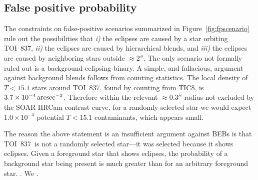 \documentclass[12pt,twocolumn,tighten]{aastex63}
\newcommand{\tn}{TOI~837} %
\begin{document}
\subsection{False positive probability}
\label{subsec:fpp}

The constraints on false-positive scenarios summarized in
Figure~\ref{fig:fpscenario} rule out the possibilities that {\it i)}
the eclipses are caused by a star orbiting \tn, {\it ii)} the eclipses
are caused by hierarchical blends, and {\it iii)} the eclipses
are caused by neighboring stars outside $\approx 2''$.  The only
scenario not formally ruled out is a background eclipsing binary.  A
simple, and fallacious, argument against background blends follows
from counting statistics.  The local density of $T<15.1$ stars around
\tn, found by counting from TIC8, is $3.7\times10^{-4} \,{\rm
arcsec}^{-2}$.  Therefore within the relevant $\approx0.3''$ radius
not excluded by the SOAR HRCam contrast curve, for a randomly selected
star we would expect $1.0\times10^{-4}$ potential $T<15.1$
contaminants, which appears small.

The reason the above statement is an insufficient argument against
BEBs is that \tn\ is not a randomly selected star---it was selected
because it shows eclipses.  Given a foreground star that shows
eclipses, the probability of a background star being present is much
greater than for an arbitrary foreground star.  .  We 
\citep{morton_efficient_2012,vespa_2015}.
\end{document}
